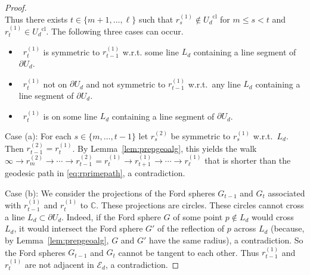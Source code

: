 \documentclass[graybox]{svmult}
\begin{document}
\begin{proof}
\[\]
Thus there exists $t\in\{m+1,\ldots,\ell\}$ such that $r_s^{(1)}\not\in {U_{d}}^{\mathrm{cl}}$ for $m \leq s<t$ and $r_t^{(1)}\in {U_{d}}^{\mathrm{cl}}$.  The following three cases can occur.
\begin{itemize}
\item[(a)]\,  $r_t^{(1)}$ is symmetric to $r_{t-1}^{(1)}$ w.r.t. some line $L_d$ containing a line segment of $\partial U_{d}$.
\item[(b)] \, $r_t^{(1)}$ not on $\partial U_{d}$  and not symmetric to $r_{t-1}^{(1)}$ w.r.t.\ any line $L_d$ containing a line segment of $\partial U_{d}$.
\item[(c)]\, $r_t^{(1)}$ is on some line $L_d$ containing a line segment of $\partial U_{d}$.
\end{itemize}

Case (a): For each $s\in\{m,\ldots, t-1\}$ let $r_s^{(2)}$ be symmetric to $r_s^{(1)}$ w.r.t.\ $L_d$. Then $r_{t-1}^{(2)}=r_t^{(1)}$. By Lemma~\ref{lem:prepgeoalg}, this yields the walk 
$\infty\to r_m^{(2)}\to \cdots \to r_{t-1}^{(2)}=r_t^{(1)}\to r_{t+1}^{(1)} \to \cdots \to r_\ell^{(1)}$ that is shorter than the geodesic path in \eqref{eq:rprimepath}, a contradiction.

Case (b): We consider the projections of the Ford spheres $G_{t-1}$ and $G_t$ associated with $r_{t-1}^{(1)}$ and $r_t^{(1)}$ to $\mathbb{C}$. These projections are circles. These circles cannot cross a line $L_d\subset \partial U_{d}$. Indeed, if the Ford sphere $G$ of some point $p\not\in L_d$ would cross $L_d$, it would intersect the Ford sphere $G'$ of the reflection of $p$ across $L_d$ (because, by Lemma~\ref{lem:prepgeoalg}, $G$ and $G'$ have the same radius), a contradiction.  So the Ford spheres $G_{t-1}$ and $G_t$ cannot be tangent to each other. Thus $r_{t-1}^{(1)}$ and $r_t^{(1)}$ are not adjacent in $\mathcal{E}_d$, a contradiction. 


\end{proof}
\end{document}
